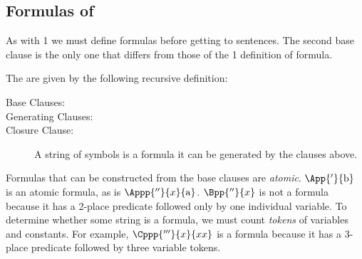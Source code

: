 \subsection{Formulas of \GQL{}}\label{Formulas of GQL}
As with \GQL{}1 we must define \GQL{} formulas before getting to \GQL{} sentences.
The second base clause is the only one that differs from those of the \GQL{}1 definition of formula.
\begin{majorILnc}{} The   are given by the following recursive definition:
\begin{description}
\item[Base Clauses:] \hfill{}
\item[Generating Clauses:] \hfill{}
\item[Closure Clause:] A string of symbols is a formula \Iff it can be generated by the clauses above.
\end{description}
\end{majorILnc}
\noindent{}Formulas that can be constructed from the base clauses are \emph{atomic}.
$\App{'}{\constant{b}}$ is an atomic formula, as is $\Appp{''}{\variable{x}}{\constant{a}}$. 
$\Bpp{''}{\variable{x}}$ is not a formula because it has a 2-place predicate followed only by one individual variable. 
To determine whether some string is a formula, we must count \emph{tokens} of variables and constants. 
For example, $\Cppp{'''}{\variable{x}}{\variable{x}\variable{x}}$ is a formula because it has a 3-place predicate followed by three variable tokens.

